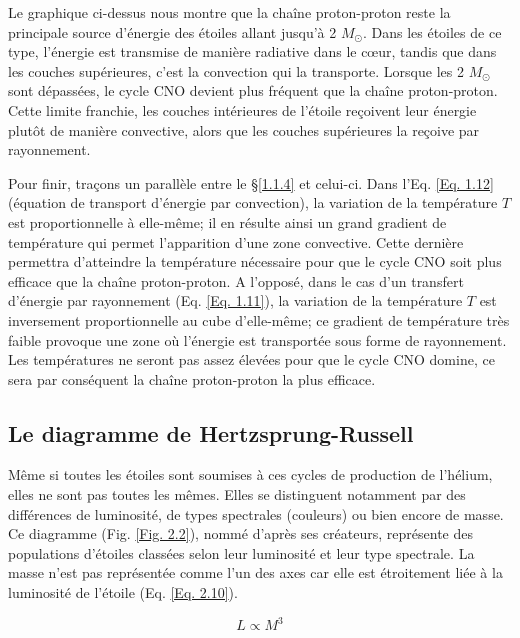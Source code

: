 Le graphique ci-dessus nous montre que la chaîne proton-proton reste la principale source d’énergie des étoiles allant jusqu’à 2 $M_\odot$. Dans les étoiles de ce type, l’énergie est transmise de manière radiative dans le cœur, tandis que dans les couches supérieures, c’est la convection qui la transporte. Lorsque les 2 $M_\odot$ sont dépassées, le cycle CNO devient plus fréquent que la chaîne proton-proton. Cette limite franchie, les couches intérieures de l’étoile reçoivent leur énergie plutôt de manière convective, alors que les couches supérieures la reçoive par rayonnement.\smallskip

Pour finir, traçons un parallèle entre le §\ref{1.1.4} et celui-ci. Dans l'Eq. \ref{Eq. 1.12} (équation de transport d'énergie par convection), la variation de la température $T$ est proportionnelle à elle-même; il en résulte ainsi un grand gradient de température qui permet l'apparition d'une zone convective. Cette dernière permettra d'atteindre la température nécessaire pour que le cycle CNO soit plus efficace que la chaîne proton-proton. A l'opposé, dans le cas d'un transfert d'énergie par rayonnement (Eq. \ref{Eq. 1.11}), la variation de la température $T$ est inversement proportionnelle au cube d'elle-même; ce gradient de température très faible provoque une zone où l'énergie est transportée sous forme de rayonnement. Les températures ne seront pas assez élevées pour que le cycle CNO domine, ce sera par conséquent la chaîne proton-proton la plus efficace. 

\subsection{Le diagramme de Hertzsprung-Russell}\label{2.1.3}

Même si toutes les étoiles sont soumises à ces cycles de production de l’hélium, elles ne sont pas toutes les mêmes. Elles se distinguent notamment par des différences de luminosité, de types spectrales (couleurs) ou bien encore de masse. Ce diagramme (Fig. \ref{Fig. 2.2}), nommé d’après ses créateurs, représente des populations d’étoiles classées selon leur luminosité et leur type spectrale. La masse n’est pas représentée comme l’un des axes car elle est étroitement liée à la luminosité de l’étoile (Eq. \ref{Eq. 2.10}).

\begin{equation}L \propto M^{3}\label{Eq. 2.10}\end{equation}\newpage


